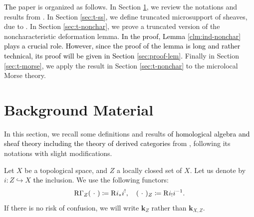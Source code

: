 ﻿\documentclass[a4paper,leqno,dvipdfmx]{jsarticle}
\theoremstyle{definition}
\newcommand{\kk}{\mathbf{k}}
\numberwithin{equation}{section}
\newcommand{\RG}{\mathop{\mathrm{R}\hspace{-0pt}\Gamma}\nolimits}
\newcommand{\Rder}[1][]{\mathop{\mathrm{R}^{#1}\hspace{-2pt}}\nolimits}
\newcommand{\blk}{\mathord{\ \cdot\ }}
\theoremstyle{mystyle}
\begin{document}



\textcolor{black}
{The} paper is organized as follows. 
In Section \ref{sec:review}, 
we review the notations and results from \cite{KS90}. 
In Section \textcolor{black}{\ref{sec:t-ss}}, 
we define truncated microsupport of sheaves, 
due to \cite{KFS03a}. 
In Section \ref{sec:t-nonchar}, 
we prove a truncated version of 
the noncharacteristic deformation lemma. 
\textcolor{black}
{In the proof, Lemma \ref{clm:ind-nonchar} plays a crucial role. 
However, since the proof of the lemma is long 
and rather technical, 
its proof will be given in Section \ref{sec:proof-lem}.}
Finally in Section \ref{sec:t-morse}, 
we apply the result in Section \ref{sec:t-nonchar} 
to the microlocal Morse theory. 

\section{Background Material}\label{sec:review}

In this section, 
we recall some definitions and results \textcolor{black}{of 
homological algebra and sheaf theory including 
the theory of derived categories} from \cite{KS90}, 
following its notations with slight modifications. 

Let \(X\) be a topological space, 
and \(Z\) a locally closed set of \(X\). 
Let us denote by \(i\colon Z\hookrightarrow X\) \textcolor{black}{the} inclusion. 
We use the following functors: 
\[
  \RG_{Z}(\blk) \coloneqq \Rder[]{i_{\ast}}i^{!}, 
  \quad
  (\blk)_{Z}\coloneqq \Rder[]{i_{!}}i^{-1}.
\]
If there is no risk of confusion, 
we will write \(\kk_Z\) rather than \(\kk_{X,Z}\).
\end{document}
